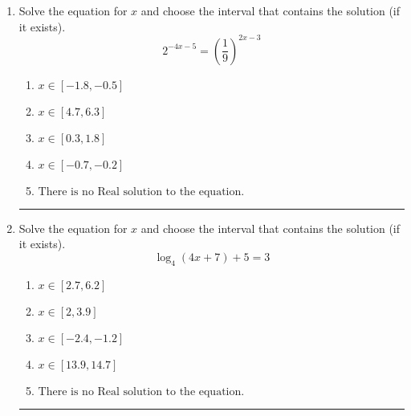 \documentclass[14pt]{extbook}
\newcommand{\litem}[1]{\item#1\hspace*{-1cm}\rule{\textwidth}{0.4pt}}
\begin{document}
\begin{enumerate}
{\begin{enumerate}[label=\Alph*.]
\end{enumerate} }
\litem{
Solve the equation for $x$ and choose the interval that contains the solution (if it exists).\[ 2^{-4x-5} = \left(\frac{1}{9}\right)^{2x-3} \]\begin{enumerate}[label=\Alph*.]
\item \( x \in [-1.8, -0.5] \)
\item \( x \in [4.7, 6.3] \)
\item \( x \in [0.3, 1.8] \)
\item \( x \in [-0.7, -0.2] \)
\item \( \text{There is no Real solution to the equation.} \)

\end{enumerate} }
\litem{
Solve the equation for $x$ and choose the interval that contains the solution (if it exists).\[ \log_{4}{(4x+7)}+5 = 3 \]\begin{enumerate}[label=\Alph*.]
\item \( x \in [2.7, 6.2] \)
\item \( x \in [2, 3.9] \)
\item \( x \in [-2.4, -1.2] \)
\item \( x \in [13.9, 14.7] \)
\item \( \text{There is no Real solution to the equation.} \)

\end{enumerate} }
\end{enumerate}
\end{document}
